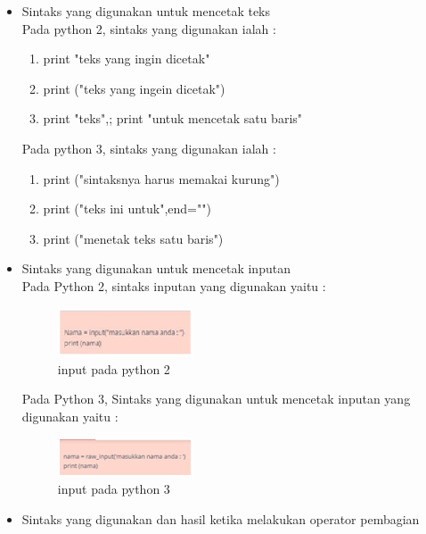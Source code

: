 \begin{enumerate}
\begin{itemize}
		\item Sintaks yang digunakan untuk mencetak teks\\
		Pada python 2, sintaks yang digunakan ialah :\\
			\begin{enumerate}
			\item print "teks yang ingin dicetak"\\
			\item print ("teks yang ingein dicetak")\\
			\item print "teks",; print "untuk mencetak satu baris"\\
			\end{enumerate}
		Pada python 3, sintaks yang digunakan ialah :\\
			\begin{enumerate}
			\item print ("sintaksnya harus memakai kurung")\\
			\item print ("teks ini untuk",end="")\\
			\item print ("menetak teks satu baris")\\
			\end{enumerate}
		\item Sintaks yang digunakan untuk mencetak inputan\\
		Pada Python 2, sintaks inputan yang digunakan  yaitu :\\
			\begin{figure}[H]
			\includegraphics[width=4cm]{figures/1184026/perbedaan1.png}
			\centering
			\caption{input pada python 2}
			\end{figure}
		Pada Python 3, Sintaks yang digunakan untuk mencetak inputan yang digunakan yaitu : 
		\hfill \break
			\begin{figure}[H]
			\includegraphics[width=4cm]{figures/1184026/perbedaan2.png}
			\centering
			\caption{input pada python 3}
			\end{figure}
		\item Sintaks yang digunakan dan hasil ketika melakukan operator pembagian\\

\end{itemize}
\end{enumerate}
